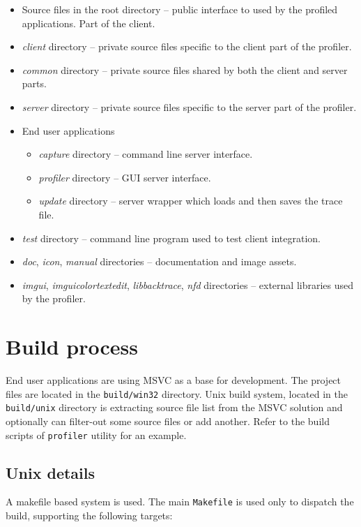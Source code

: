 \documentclass[hidelinks,titlepage,a4paper]{article}
\begin{document}
\begin{itemize}
\item Source files in the root directory -- public interface to used by the profiled applications. Part of the client.
\item \emph{client} directory -- private source files specific to the client part of the profiler.
\item \emph{common} directory -- private source files shared by both the client and server parts.
\item \emph{server} directory -- private source files specific to the server part of the profiler.
\item End user applications
\begin{itemize}
\item \emph{capture} directory -- command line server interface.
\item \emph{profiler} directory -- GUI server interface.
\item \emph{update} directory -- server wrapper which loads and then saves the trace file.
\end{itemize}
\item \emph{test} directory -- command line program used to test client integration.
\item \emph{doc}, \emph{icon}, \emph{manual} directories -- documentation and image assets.
\item \emph{imgui}, \emph{imguicolortextedit}, \emph{libbacktrace}, \emph{nfd} directories -- external libraries used by the profiler.
\end{itemize}

\section{Build process}

End user applications are using MSVC as a base for development. The project files are located in the \texttt{build/win32} directory. Unix build system, located in the \texttt{build/unix} directory is extracting source file list from the MSVC solution and optionally can filter-out some source files or add another. Refer to the build scripts of \texttt{profiler} utility for an example.

\subsection{Unix details}

A makefile based system is used. The main \texttt{Makefile} is used only to dispatch the build, supporting the following targets:
\end{document}
